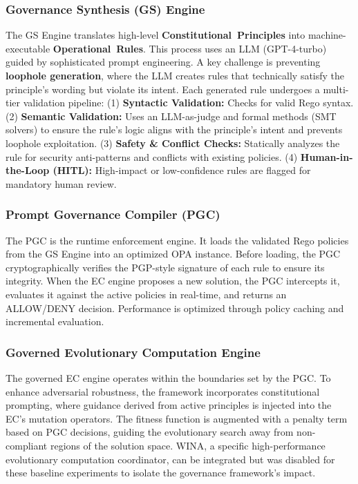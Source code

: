 \subsubsection{Governance Synthesis (GS) Engine}
{\sloppy
The GS Engine translates high-level \textbf{Constitutional\allowbreak\ Principles} into machine-executable \textbf{Operational\allowbreak\ Rules}. This process uses an LLM (GPT-4-turbo) guided by sophisticated prompt engineering. A key challenge is preventing \textbf{loophole generation}, where the LLM creates rules that technically satisfy the principle's wording but violate its intent. Each generated rule undergoes a multi-tier validation pipeline:
(1) \textbf{Syntactic Validation:} Checks for valid Rego syntax.
(2) \textbf{Semantic Validation:} Uses an LLM-as-judge and formal methods (SMT solvers) to ensure the rule's logic aligns with the principle's intent and prevents loophole exploitation.
(3) \textbf{Safety \& Conflict Checks:} Statically analyzes the rule for security anti-patterns and conflicts with existing policies.
(4) \textbf{Human-in-the-Loop (HITL):} High-impact or low-confidence rules are flagged for mandatory human review.
}

\subsubsection{Prompt Governance Compiler (PGC)}
The PGC is the runtime enforcement engine. It loads the validated Rego policies from the GS Engine into an optimized OPA instance. Before loading, the PGC cryptographically verifies the PGP-style signature of each rule to ensure its integrity. When the EC engine proposes a new solution, the PGC intercepts it, evaluates it against the active policies in real-time, and returns an ALLOW/DENY decision. Performance is optimized through policy caching and incremental evaluation.

\subsubsection{Governed Evolutionary Computation Engine}
The governed EC engine operates within the boundaries set by the PGC\@. To enhance adversarial robustness, the framework incorporates constitutional prompting, where guidance derived from active principles is injected into the EC's mutation operators. The fitness function is augmented with a penalty term based on PGC decisions, guiding the evolutionary search away from non-compliant regions of the solution space. WINA, a specific high-performance evolutionary computation coordinator, can be integrated but was disabled for these baseline experiments to isolate the governance framework's impact.

